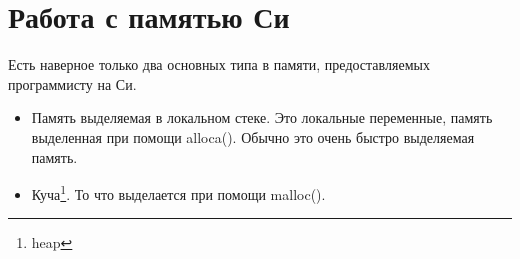 \section{Работа с памятью Си}

Есть наверное только два основных типа в памяти, предоставляемых программисту на Си.

\begin{itemize}
\item
Память выделяемая в локальном стеке. Это локальные переменные, память выделенная при помощи alloca().
Обычно это очень быстро выделяемая память.

\item
Куча\footnote{heap}. То что выделается при помощи malloc().
\end{itemize}





